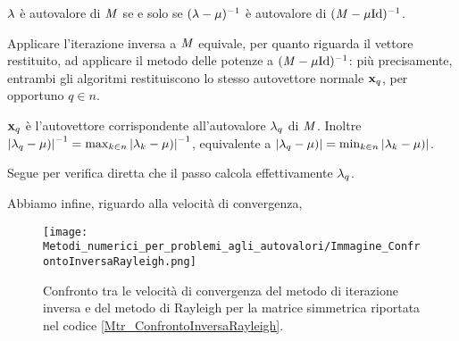 \par $\lambda$ \`e autovalore di $\mathit{M}$ se e solo se
$(\lambda - \mu)^{-1}$ \`e autovalore di
$(\Matrix - \VarEigenvalue\Identity)^{-1}$.
\par Applicare l'iterazione inversa a $\mathit{M}$ equivale, per quanto riguarda il
vettore restituito, ad applicare il metodo delle potenze a
$(\Matrix - \VarEigenvalue\Identity)^{-1}$: pi\`u precisamente, entrambi gli
algoritmi restituiscono lo stesso autovettore normale $\Eigenvector_q$, per
opportuno $q \in n$.
\par $\Eigenvector_q$ \`e l'autovettore corrispondente all'autovalore
$\lambda_q$ di $\mathit{M}$. Inoltre
$\left \lvert \lambda_q - \mu) \right \rvert^{-1}
= \max_{k \in n} \left \lvert \lambda_k - \mu) \right \rvert^{-1}$,
equivalente a
$\left \lvert \lambda_q - \mu) \right \rvert
= \min_{k \in n} \left \lvert \lambda_k - \mu) \right \rvert$.
\par Segue per verifica diretta che il passo \label{IterazioneInversa_4} calcola
effettivamente $\lambda_q$.
\par Abbiamo infine, riguardo alla velocit\`a di convergenza,
\begin{listing}
	\caption{Implementazione del quoziente di Rayleigh in .}
\end{listing}
\begin{figure}
	\texttt{[image: Metodi\_numerici\_per\_problemi\_agli\_autovalori/Immagine\_ConfrontoInversaRayleigh.png]}
	\centering
	\caption[Confronto tra le velocit\`a di convergenza del metodo di iterazione inversa e del
  metodo di Rayleigh per una matrice simmetrica $10 \times 10$.]
	{Confronto tra le velocit\`a di convergenza del metodo di iterazione inversa e del
  metodo di Rayleigh per la matrice simmetrica riportata nel codice
  \ref{Mtr_ConfrontoInversaRayleigh}.}
  \label{Imm_ConfrontoInversaRayleigh}
\end{figure}
\begin{listing}
	\inputminted[fontsize=\small]{octave}{Metodi_numerici_per_problemi_agli_autovalori/tests/Hermitiana_UnicoAutovaloreDiModuloMassimo}
	\caption[Matrice usata per effettuare il confronto del grafico di figura
  \ref{Imm_ConfrontoInversaRayleigh}.]
	{Matrice usata per effettuare il confronto del grafico di figura
  \ref{Imm_ConfrontoInversaRayleigh} (formato di memorizzazione di ).}
  \label{Mtr_ConfrontoInversaRayleigh}
\end{listing}
